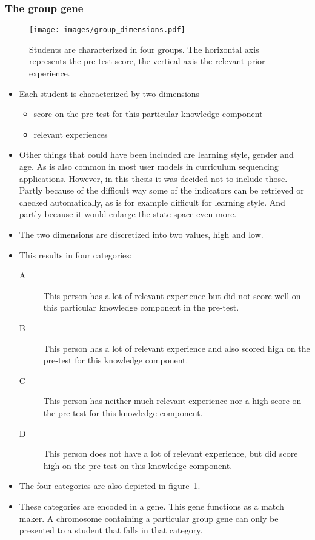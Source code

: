 \subsubsection{The group gene}
\begin{figure}[ht!]
	\centering
	\texttt{[image: images/group\_dimensions.pdf]}
	\caption[Group characterization]{Students are characterized in four groups.
		The horizontal axis represents the pre-test score, the vertical axis
		the relevant prior experience.}
	\label{fig:group_dimensions}
\end{figure}
\begin{itemize}
	\item Each student is characterized by two dimensions
		\begin{itemize}
			\item score on the pre-test for this particular knowledge component
			\item relevant experiences
		\end{itemize}
	\item Other things that could have been included are learning
		style, gender and age. As is also common in most user models in
		curriculum sequencing applications. However, in this thesis it
		was decided not to include those. Partly because of the
		difficult way some of the indicators can be retrieved or
		checked automatically, as is for example difficult for learning
		style. And partly because it would enlarge the state space even
		more.
	\item The two dimensions are discretized into two values, high and low.
	\item This results in four categories:
		\begin{description}
			\item[A] This person has a lot of relevant experience but did not
				score well on this particular knowledge component in the
				pre-test.
			\item[B] This person has a lot of relevant experience and also
				scored high on the pre-test for this knowledge component.
			\item[C] This person has neither much relevant experience nor
				a high score on the pre-test for this knowledge component.
			\item[D] This person does not have a lot of relevant experience,
				but did score high on the pre-test on this knowledge component.
		\end{description}
	\item The four categories are also depicted in figure~\ref{fig:group_dimensions}.
	\item These categories are encoded in a gene. This gene functions as a
		match maker. A chromosome containing a particular group gene can only
		be presented to a student that falls in that category.
\end{itemize}
